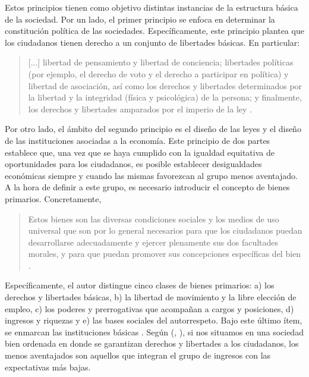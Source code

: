 Estos principios tienen como objetivo distintas instancias de la estructura básica de la sociedad. Por un lado, el primer principio se enfoca en determinar la constitución política de las sociedades. Específicamente, este principio plantea que los ciudadanos tienen derecho a un conjunto de libertades básicas. En particular: 

\vspace{3mm}
\begin{quote}
[...] libertad de pensamiento y libertad de conciencia; libertades políticas (por ejemplo, el derecho de voto y el derecho a participar en política) y libertad de asociación, así como los derechos y libertades determinados por la libertad y la integridad (física y psicológica) de la persona; y finalmente, los derechos y libertades amparados por el imperio de la ley \citep[p. 75]{Rawls_2002}.
\end{quote}
\vspace{3mm}

Por otro lado, el ámbito del segundo principio es el diseño de las leyes y el diseño de las instituciones asociadas a la economía. Este principio de dos partes establece que, una vez que se haya cumplido con la igualdad equitativa de oportunidades para los ciudadanos, es posible establecer desigualdades económicas siempre y cuando las mismas favorezcan al grupo menos aventajado. A la hora de definir a este grupo, es necesario introducir el concepto de bienes primarios. Concretamente, 

\vspace{3mm}
\begin{quote}
    Estos bienes son las diversas condiciones sociales y los medios de uso universal que son por lo general necesarios para que los ciudadanos puedan desarrollarse adecuadamente y ejercer plenamente sus dos facultades morales, y para que puedan promover sus concepciones específicas del bien \citep[p. 90]{Rawls_2002}.
\end{quote}
\vspace{3mm}

Específicamente, el autor distingue cinco clases de bienes primarios: a) los derechos y libertades básicas, b) la libertad de movimiento y la libre elección de empleo, c) los poderes y prerrogativas que acompañan a cargos y posiciones, d) ingresos y riquezas y e) las bases sociales del autorrespeto. Bajo este último ítem, se enmarcan las instituciones básicas  \citep[p. 92]{Rawls_2002}. Según \citeauthor{Rawls_1971} (\citeyear{Rawls_1971}, \citeyear{Rawls_2002}), si nos situamos en una sociedad bien ordenada en donde se garantizan derechos y libertades a los ciudadanos, los menos aventajados son aquellos que integran el grupo de ingresos con las expectativas más bajas.

